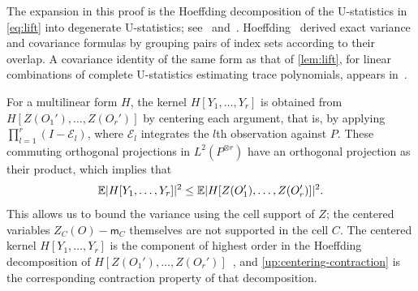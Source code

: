 The expansion in this proof is the Hoeffding decomposition of the
U-statistics in \eqref{eq:lift} into degenerate U-statistics;
see~\cite[Sections~11.4 and~12.3]{vandervaart}
and~\cite[Section~5.1.5, Lemma~A]{serfling}.
Hoeffding~\cite[Sections~5--6]{hoeffding} derived exact variance and
covariance formulas by grouping pairs of index sets according to their
overlap. A covariance identity of the same form as that of
\cref{lem:lift}, for linear combinations of complete U-statistics
estimating trace polynomials, appears in~\cite[Theorem~6.2]{song2026}.

For a multilinear form $H$, the kernel $H[Y_1,\ldots,Y_r]$ is obtained
from $H[Z(O_1'),\ldots,Z(O_r')]$ by centering each argument, that is, by
applying $\prod_{l=1}^r(I-\mathcal E_l)$, where $\mathcal E_l$ integrates
the $l$th observation against $P$. These commuting orthogonal projections
in $L^2(P^{\otimes r})$ have an orthogonal projection as their product,
which implies that
\begin{equation}\label{up:centering-contraction}
 \mathbb E|H[Y_1,\ldots,Y_r]|^2
 \le\mathbb E|H[Z(O_1'),\ldots,Z(O_r')]|^2.
\end{equation}
This allows us to bound the variance using the cell support of $Z$; the
centered variables $Z_C(O)-\mathsf m_C$ themselves are not supported in
the cell $C$. The centered kernel $H[Y_1,\ldots,Y_r]$ is the component of
highest order in the Hoeffding decomposition of
$H[Z(O_1'),\ldots,Z(O_r')]$~\cite[Section~11.4]{vandervaart}, and
\eqref{up:centering-contraction} is the corresponding contraction
property of that decomposition.

